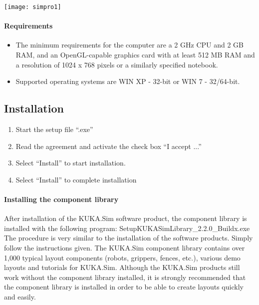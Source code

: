 	\begin{center}
	\texttt{[image: simpro1]}
	\end{center}
	 
	 \paragraph{Requirements}
	 	\begin{itemize}
	 	\item The minimum requirements for the computer are a 2 GHz CPU and 2 GB RAM, and an OpenGL-capable graphics card with at least 512 MB RAM and a resolution of 1024 x 768 pixels or a similarly specified notebook.
	 	\item Supported operating systems are WIN XP - 32-bit or WIN 7 - 32/64-bit.
	 \end{itemize}
 
 	\subsection{Installation}
 		\begin{enumerate}
 			\item Start the setup file “.exe”
 			\item Read the agreement and activate the check box “I accept ...”
 			\item Select “Install” to start installation.
 			\item Select “Install” to complete installation
 		\end{enumerate}
 	
 	\paragraph{Installing the component library }
 	After installation of the KUKA.Sim software product, the component library is installed with the following program: SetupKUKASimLibrary\_2.2.0\_Buildx.exe The procedure is very similar to the installation of the software products. Simply follow the instructions given.
 	The KUKA.Sim component library contains over 1,000 typical layout components (robots, grippers, fences, etc.), various demo layouts and tutorials for KUKA.Sim. Although the KUKA.Sim products still work without the component library installed, it is strongly recommended that the component library is installed in order to be able to create layouts quickly and easily.
 	
